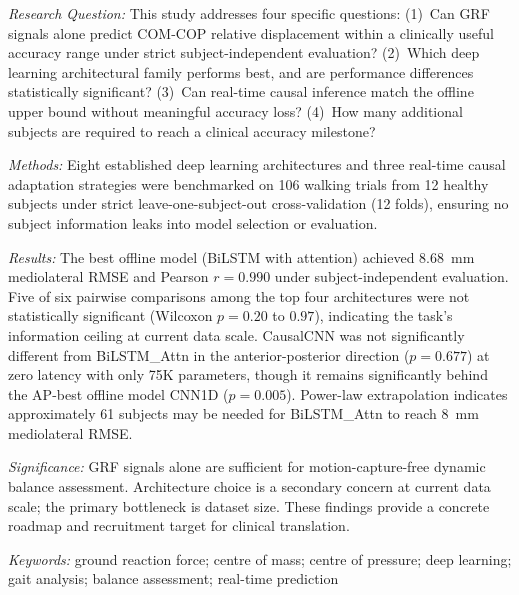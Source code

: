 \documentclass[preprint,12pt]{elsarticle}
\begin{document}
\bigskip
\noindent\textit{Research Question:}
This study addresses four specific questions: (1)~Can GRF signals alone predict
COM-COP relative displacement within a clinically useful accuracy range under strict
subject-independent evaluation?
(2)~Which deep learning architectural family performs best, and are performance
differences statistically significant?
(3)~Can real-time causal inference match the offline upper bound without meaningful
accuracy loss?
(4)~How many additional subjects are required to reach a clinical accuracy milestone?

\bigskip
\noindent\textit{Methods:}
Eight established deep learning architectures and three real-time causal adaptation
strategies were benchmarked on 106 walking trials from 12 healthy subjects under
strict leave-one-subject-out cross-validation (12 folds), ensuring no subject
information leaks into model selection or evaluation.

\bigskip
\noindent\textit{Results:}
The best offline model (BiLSTM with attention) achieved 8.68~mm mediolateral RMSE
and Pearson $r = 0.990$ under subject-independent evaluation.
Five of six pairwise comparisons among the top four architectures were not
statistically significant (Wilcoxon $p = 0.20$ to $0.97$), indicating the task's
information ceiling at current data scale.
CausalCNN was not significantly different from BiLSTM\_Attn in the
anterior-posterior direction ($p = 0.677$) at zero latency with only 75K
parameters, though it remains significantly behind the AP-best offline model
CNN1D ($p = 0.005$).
Power-law extrapolation indicates approximately 61 subjects may be needed for
BiLSTM\_Attn to reach 8~mm mediolateral RMSE.

\bigskip
\noindent\textit{Significance:}
GRF signals alone are sufficient for motion-capture-free dynamic balance assessment.
Architecture choice is a secondary concern at current data scale; the primary
bottleneck is dataset size.
These findings provide a concrete roadmap and recruitment target for clinical
translation.

\bigskip
\noindent\textit{Keywords:} ground reaction force; centre of mass; centre of
pressure; deep learning; gait analysis; balance assessment; real-time prediction
\end{document}
